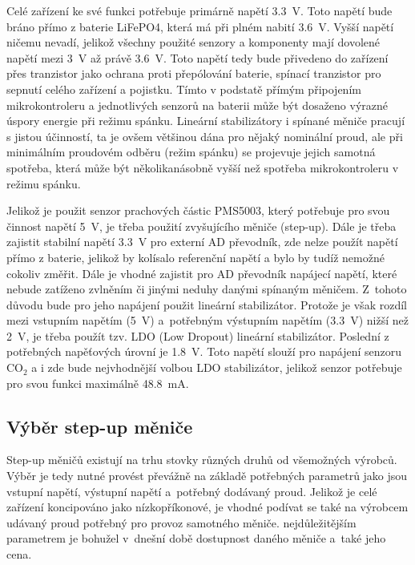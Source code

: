 Celé zařízení ke své funkci potřebuje primárně napětí \SI{3,3}{\volt}. Toto napětí bude bráno přímo z baterie LiFePO4, která má při plném nabití \SI{3,6}{\volt}. Vyšší napětí ničemu nevadí, jelikož všechny použité senzory a komponenty mají dovolené napětí mezi \SI{3}{\volt} až právě \SI{3,6}{\volt}. Toto napětí tedy bude přivedeno do zařízení přes tranzistor jako ochrana proti přepólování baterie, spínací tranzistor pro sepnutí celého zařízení a pojistku. Tímto v podstatě přímým připojením mikrokontroleru a jednotlivých senzorů na baterii může být dosaženo výrazné úspory energie při režimu spánku. Lineární stabilizátory i spínané měniče pracují s jistou účinností, ta je ovšem většinou dána pro nějaký nominální proud, ale při minimálním proudovém odběru (režim spánku) se projevuje jejich samotná spotřeba, která může být několikanásobně vyšší než spotřeba mikrokontroleru v režimu spánku.

Jelikož je použit senzor prachových částic PMS5003, který potřebuje pro svou činnost napětí \SI{5}{\volt}, je třeba použití zvyšujícího měniče (step-up). Dále je třeba zajistit stabilní napětí \SI{3,3}{\volt} pro externí AD převodník, zde nelze použít napětí přímo z baterie, jelikož by kolísalo referenční napětí a bylo by tudíž nemožné cokoliv změřit. Dále je vhodné zajistit pro AD převodník napájecí napětí, které nebude zatíženo zvlněním či jinými neduhy danými spínaným měničem. Z~tohoto důvodu bude pro jeho napájení použit lineární stabilizátor. Protože je však rozdíl mezi vstupním napětím (\SI{5}{\volt}) a~potřebným výstupním napětím (\SI{3,3}{\volt}) nižší než \SI{2}{\volt}, je třeba použít tzv. LDO (Low Dropout) lineární stabilizátor. Poslední z potřebných napěťových úrovní je \SI{1.8}{\volt}. Toto napětí slouží pro napájení senzoru CO$_2$ a i zde bude nejvhodnější volbou LDO stabilizátor, jelikož senzor potřebuje pro svou funkci maximálně \SI{48.8}{\milli\ampere}.

\subsection{Výběr step-up měniče}

Step-up měničů existují na trhu stovky různých druhů od všemožných výrobců. Výběr je tedy nutné provést převážně na základě potřebných parametrů jako jsou vstupní napětí, výstupní napětí a~potřebný dodávaný proud. Jelikož je celé zařízení koncipováno jako nízkopříkonové, je vhodné podívat se také na výrobcem udávaný proud potřebný pro provoz samotného měniče. nejdůležitějším parametrem je bohužel v~dnešní době dostupnost daného měniče a~také jeho cena.

